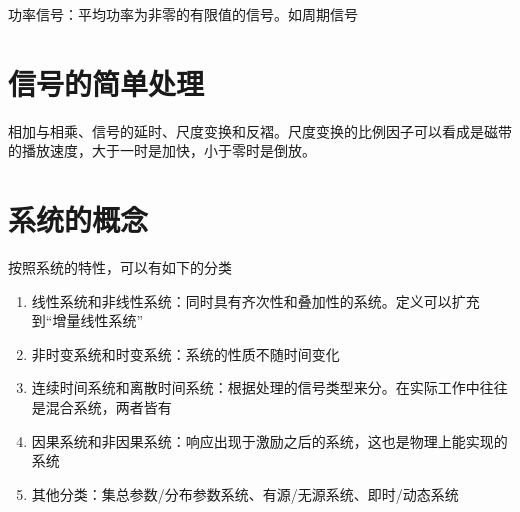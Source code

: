 功率信号：平均功率为非零的有限值的信号。如周期信号

{\color{blue}{能量信号与功率信号是互斥的；存在于无限时间内的非周期信号可以是能量信号也可以是功率信号}}
\section{信号的简单处理}
相加与相乘、信号的延时、尺度变换和反褶。尺度变换的比例因子可以看成是磁带的播放速度，大于一时是加快，小于零时是倒放。
\section{系统的概念}
按照系统的特性，可以有如下的分类
\begin{enumerate}
    \item 线性系统和非线性系统：同时具有齐次性和叠加性的系统。定义可以扩充到“增量线性系统”
    \item 非时变系统和时变系统：系统的性质不随时间变化
    \item 连续时间系统和离散时间系统：根据处理的信号类型来分。在实际工作中往往是混合系统，两者皆有
    \item 因果系统和非因果系统：响应出现于激励之后的系统，这也是物理上能实现的系统
    \item 其他分类：集总参数/分布参数系统、有源/无源系统、即时/动态系统
\end{enumerate}